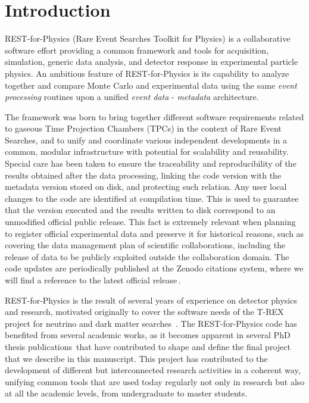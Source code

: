 \section{Introduction}
\label{sec:intro}

REST-for-Physics (Rare Event Searches Toolkit for Physics) is a collaborative software effort providing a common framework and tools for acquisition, simulation, generic data analysis, and detector response in experimental particle physics. An ambitious feature of REST-for-Physics is its capability to analyze together and compare Monte Carlo and experimental data using the same \emph{event processing} routines upon a unified \emph{event data} - \emph{metadata} architecture. 

The framework was born to bring together different software requirements related to gaseous Time Projection Chambers (TPCs) in the context of Rare Event Searches, and to unify and coordinate various independent developments in a common, modular infrastructure with potential for scalability and reusability. Special care has been taken to ensure the traceability and reproducibility of the results obtained after the data processing, linking the code version with the metadata version stored on disk, and protecting such relation. Any user local changes to the code are identified at compilation time. This is used to guarantee that the version executed and the results written to disk correspond to an unmodified official public release. This fact is extremely relevant when planning to register official experimental data and preserve it for historical reasons, such as covering the data management plan of scientific collaborations, including the release  of data to be publicly exploited outside the collaboration domain. The code updates are periodically published at the Zenodo citations system, where we will find a reference to the latest official release\,\cite{javier_galan_2021_5092550}.

REST-for-Physics is the result of several years of experience on detector physics and research, motivated originally to cover the software needs of the T-REX project for neutrino and dark matter searches~\cite{Irastorza:2015dcb,Irastorza:2015geo}. The REST-for-Physics code has benefited from several academic works, as it becomes apparent in several PhD thesis publications\,\cite{IguazThesis,tomas2013development,SeguiThesis,HerreraThesis,GraciaThesis, GarciaPascualThesis, RuizThesis} that have contributed to shape and define the final project that we describe in this manuscript.
This project has contributed to the development of different but interconnected research activities in a coherent way, unifying common tools that are used today regularly not only in research but also at all the academic levels, from undergraduate to master students. 

